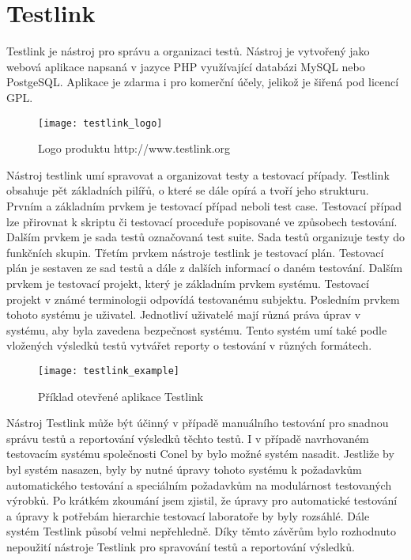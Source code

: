 \section{Testlink}
Testlink je nástroj pro správu a organizaci testů. Nástroj je vytvořený jako webová aplikace napsaná v jazyce PHP využívající databázi MySQL nebo PostgeSQL. Aplikace je zdarma i pro komerční účely, jelikož je šiřená pod licencí GPL.

\begin{figure}[h]
  \centering
  \texttt{[image: testlink\_logo]}
  \caption{Logo produktu http://www.testlink.org}
  \label{fig:testlink_logo}
\end{figure}

Nástroj testlink umí spravovat a organizovat testy a testovací případy. Testlink obsahuje pět základních pilířů, o které se dále opírá a tvoří jeho strukturu. Prvním a základním prvkem je testovací případ neboli test case. Testovací případ lze přirovnat k skriptu či testovací proceduře popisované ve způsobech testování. Dalším prvkem je sada testů označovaná test suite. Sada testů organizuje testy do funkčních skupin. Třetím prvkem nástroje testlink je testovací plán. Testovací plán je sestaven ze sad testů a dále z dalších informací o daném testování. Dalším prvkem je testovací projekt, který je základním prvkem systému. Testovací projekt v známé terminologii odpovídá testovanému subjektu. Posledním prvkem tohoto systému je uživatel. Jednotliví uživatelé mají různá práva úprav v systému, aby byla zavedena bezpečnost systému. Tento systém umí také podle vložených výsledků testů vytvářet reporty o testování v různých formátech.

\begin{figure}[h]
  \centering
  \texttt{[image: testlink\_example]}
  \caption{Příklad otevřené aplikace Testlink}
  \label{fig:testlink_example}
\end{figure}

Nástroj Testlink může být účinný v případě manuálního testování pro snadnou správu testů a reportování výsledků těchto testů. I v případě navrhovaném testovacím systému společnosti Conel by bylo možné systém nasadit. Jestliže by byl systém nasazen, byly by nutné úpravy tohoto systému k požadavkům automatického testování a speciálním požadavkům na modulárnost testovaných výrobků. Po krátkém zkoumání jsem zjistil, že úpravy pro automatické testování a úpravy k potřebám hierarchie  testovací laboratoře by byly rozsáhlé. Dále systém Testlink působí velmi nepřehledně. Díky těmto závěrům bylo rozhodnuto nepoužití nástroje Testlink pro spravování testů a reportování výsledků.


